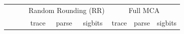 \documentclass[11pt]{article}
\begin{document}
\begin{table}[]
    \centering
    \small
    \begin{subfigure}[t]{\linewidth}
    \centering
    \begin{tabular}{|lll|c|c|c|c|c|c|}
    \hline
    \multicolumn{3}{|c}{ \multirow{2}{*}{Application} } & \multicolumn{3}{|c|}{Random Rounding (RR)} & \multicolumn{3}{c|}{Full MCA} \\
    \cline{4-9}
    & & & trace & parse & sigbits & trace & parse & sigbits \\
    \hline
    

\end{tabular}
\end{subfigure}
\end{table}
\end{document}
